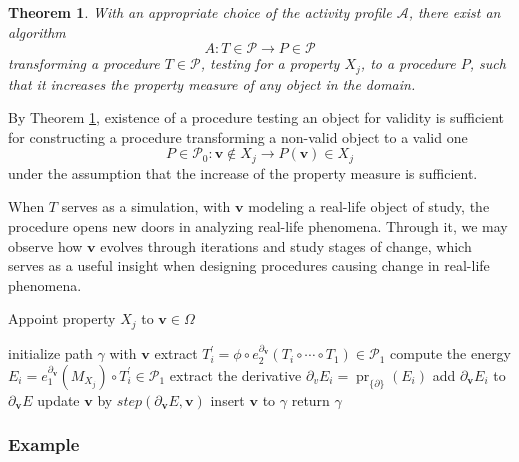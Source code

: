 \documentclass[smallcondensed]{svjour3}
\newcommand{\vv}{\mathbf{v}}
\newcommand{\dP}{\mathcal{P}}
\newcommand{\D}{\partial}
\DeclareMathOperator{\proj}{pr}
\newtheorem{izrek}{Theorem}[section]
\begin{document}
      \begin{izrek}\label{izr:algA}
           With an appropriate choice of the activity profile $\mathcal{A}$, there exist an algorithm
           \begin{equation}\label{eq:algA1}
             A:T\in\dP\to P\in\dP
             \end{equation}
             transforming a procedure $T\in\dP$, testing for a property $X_j$, to a procedure $P$, such that it increases the property measure of any object in the domain. 
           \end{izrek}
           \begin{corollary}
              By Theorem \ref{izr:algA}, existence of a procedure testing an object for validity is sufficient for constructing a procedure transforming a non-valid object to a valid one
              $$P\in \dP_0:\vv\notin X_j\to P(\vv)\in X_j$$
              under the assumption that the increase of the property measure is sufficient.
              \end{corollary}
              
    When $T$ serves as a simulation, with $\vv$ modeling a real-life object of study, the procedure opens new doors in analyzing real-life phenomena. Through it, we may observe how $\vv$ evolves through iterations and study stages of change, which serves as a useful insight when designing procedures causing change in real-life phenomena.          
   
   \begin{algorithm}[H]
   \caption{Appoint property $X_j$ to $\vv\in \Omega$}
   \label{alg:appoint}
   \begin{algorithmic}[1]
   \Procedure{Appoint property $X_j$ to $\vv\in \Omega$}{}
   \State initialize path $\gamma$ with $\vv$
   \State extract $T^\prime_i=\phi\circ e^{\D_{\vv}}_2(T_i\circ\cdots\circ T_1)\in\dP_1$
   \State compute the energy $E_i=e^{\D_\vv}_1(M_{X_j})\circ T^\prime_i\in\dP_1$
   \State extract the derivative $\D_v E_i=\proj_{\{\D\}}(E_i)$
   \State add $\D_\vv E_i$ to $\D_\vv E$
   \EndFor
   \State update $\vv$ by $step(\D_\vv E,\vv)$
   \State insert $\vv$ to $\gamma$
   \EndFor
   \State return $\gamma$
   \EndProcedure
   \end{algorithmic}
   \end{algorithm}

   
   \subsubsection{Example}
   
\end{document}
